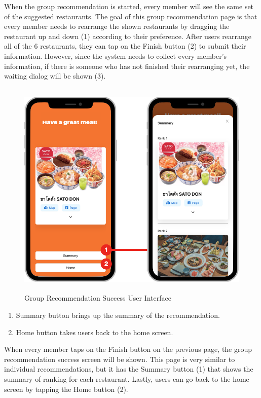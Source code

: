 \documentclass[12pt,oneside,openright,a4paper]{cpe-english-project}
\begin{document}
When the group recommendation is started, every member will see the same set of the suggested restaurants. The goal of this group recommendation page is that every member needs to rearrange the shown restaurants by dragging the restaurant up and down (1) according to their preference. After users rearrange all of the 6 restaurants, they can tap on the Finish button (2) to submit their information. However, since the system needs to collect every member’s information, if there is someone who has not finished their rearranging yet, the waiting dialog will be shown (3).
\begin{figure}[H]\centering
\includegraphics[height=300pt]{./images/4ui_GroupRecommendationSuccessUserInterface.png}
\caption{Group Recommendation Success User Interface}\label{fig:4ui_GroupRecommendationSuccessUserInterface}
\end{figure}\vspace{-24pt}

\begin{enumerate}
\item Summary button brings up the summary of the recommendation.
\item Home button takes users back to the home screen.
\end{enumerate}

When every member taps on the Finish button on the previous page, the group recommendation success screen will be shown. This page is very similar to individual recommendations, but it has the Summary button (1) that shows the summary of ranking for each restaurant. Lastly, users can go back to the home screen by tapping the Home button (2).
\end{document}
